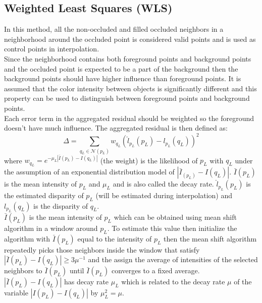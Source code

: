 \subsection{Weighted Least Squares (WLS)}
In this method, all the non-occluded and filled occluded neighbors in a neighborhood around the occluded point is considered valid points and is used as control points in interpolation.\\

Since the neighborhood contains both foreground points and background points and the occluded point is expected to be a part of the background then the background points should have higher influence than foreground points. It is assumed that the color intensity between objects is significantly different and this property can be used to distinguish between foreground points and background points. \\

Each error term in the aggregated residual should be weighted so the foreground doesn't have much influence. The aggregated residual is then defined as:
\begin{equation}
  \Delta = \sum_{q_L \in \mathcal{N}(p_L)} w_{q_L} (\hat{l}_{p_L}(p_L)-l_{p_L}(q_L))^2
\end{equation}
where $w_{q_L} = e^{-\mu_L | \bar{I}(p_L) - I(q_L)|}$ (the weight) is the likelihood of $p_L$ with $q_L$ under the assumption of an exponential distribution model of $| \bar{I}_(p_L)- I(q_L) |$. $\bar{I}(p_L)$ is the mean intensity of $p_L$ and $\mu_L$ and is also called the decay rate. $\hat{l}_{p_L}(p_L)$ is the estimated disparity of $p_L$ (will be estimated during interpolation) and $l_{p_L}(q_L)$ is the disparity of $q_L$. \\

$\bar{I}(p_L)$ is the mean intensity of $p_L$ which can be obtained using mean shift algorithm in a window around $p_L$. To estimate this value then initialize the algorithm with $\bar{I}(p_L) $ equal to the intensity of $p_L$ then the mean shift algorithm repeatedly picks those neighbors inside the window that satisfy $| \bar{I}(p_L) - I (q_L) | \geq 3\mu^{-1}$ and the assign the average of intensities of the selected neighbors to $\bar{I}(p_L)$ until $\bar{I}(p_L)$ converges to a fixed average. $|\bar{I}(p_L) - I(q_L)|$ has decay rate $\mu_L$ which is related to the decay rate $\mu$ of the variable $|I(p_L) - I(q_L)|$ by $\mu_L^2 = \mu$.\\

